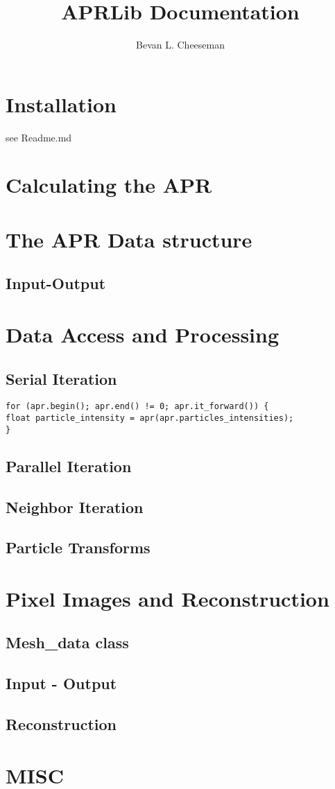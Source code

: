 \documentclass[12pt]{article}
\title{APRLib Documentation}
\author
{Bevan L. Cheeseman}
\begin{document}
\maketitle

\section{Installation}
see Readme.md

\section{Calculating the APR}

\section{The APR Data structure}


\subsection{Input-Output}

\section{Data Access and Processing}


\subsection{Serial Iteration}

\begin{lstlisting}
for (apr.begin(); apr.end() != 0; apr.it_forward()) {
float particle_intensity = apr(apr.particles_intensities);
}
\end{lstlisting}

\subsection{Parallel Iteration}


\subsection{Neighbor Iteration}


\subsection{Particle Transforms}

\section{Pixel Images and Reconstruction}
\subsection{Mesh\_data class}

\subsection{Input - Output}

\subsection{Reconstruction}

\section{MISC}
\end{document}
